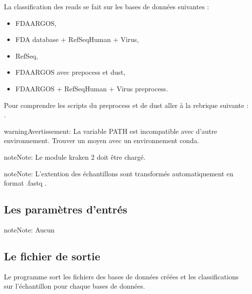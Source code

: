 \documentclass[letterpaper,10pt,french]{sphinxmanual}
\begin{document}
La classification des reads se fait sur les bases de données suivantes :
\begin{itemize}
\item {} 
FDA\sphinxhyphen{}ARGOS,

\item {} 
FDA database + RefSeqHuman + Virus,

\item {} 
RefSeq,

\item {} 
FDA\sphinxhyphen{}ARGOS avec prepocess et dust,

\item {} 
FDA\sphinxhyphen{}ARGOS + RefSeqHuman + Virus preprocess.

\end{itemize}

Pour comprendre les scripts du preprocess et de dust aller à la rebrique suivante : .

\begin{sphinxadmonition}{warning}{Avertissement:}
La variable PATH est incompatible avec d’autre environnement. Trouver un moyen avec un environnement conda.
\end{sphinxadmonition}

\begin{sphinxadmonition}{note}{Note:}
Le module kraken 2 doit être chargé.
\end{sphinxadmonition}

\begin{sphinxadmonition}{note}{Note:}
L’extention des échantillons sont transformés automatiquement en format .fastq .
\end{sphinxadmonition}


\subsection{Les paramètres d’entrés}
\label{\detokenize{cluster/cluster_create_2_custom_databases_and_classify.sh:les-parametres-d-entres}}
\begin{sphinxadmonition}{note}{Note:}
Aucun
\end{sphinxadmonition}


\subsection{Le fichier de sortie}
\label{\detokenize{cluster/cluster_create_2_custom_databases_and_classify.sh:le-fichier-de-sortie}}
Le programme sort les fichiers des bases de données créées et les classifications sur l’échantillon pour chaque bases de données.
\end{document}
